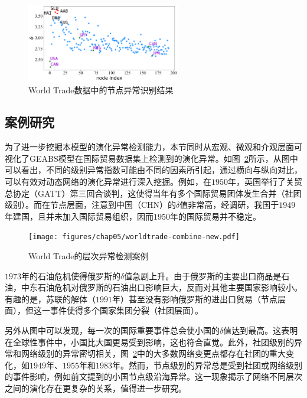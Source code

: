 \begin{figure}
	\centering
	\includegraphics[width=0.6\textwidth]{figures/chap05/worldtradenode-adjusted.pdf}
	\caption{World Trade数据中的节点异常识别结果}
	\label{fig:worldtradenode}
\end{figure}



\subsection{案例研究}

为了进一步挖掘本模型的演化异常检测能力，本节同时从宏观、微观和介观层面可视化了GEABS模型在国际贸易数据集上检测到的演化异常。如图~\ref{fig:worldtradecase}所示，从图中可以看出，不同的级别异常指数可能由不同的因素所引起，通过横向与纵向对比，可以有效对动态网络的演化异常进行深入挖掘。例如，在$1950$年，英国举行了关贸总协定（GATT）第三回合谈判，这使得当年有多个国际贸易团体发生合并（社团级别）。而在节点层面，注意到中国（CHN）的$\delta$值非常高，经调研，我国于$1949$年建国，且并未加入国际贸易组织，因而$1950$年的国际贸易并不稳定。

\begin{figure}
	\centering
	\texttt{[image: figures/chap05/worldtrade-combine-new.pdf]}
	\caption{World Trade的层次异常检测案例}
	\label{fig:worldtradecase}
\end{figure}

$1973$年的石油危机使得俄罗斯的$\delta$值急剧上升。由于俄罗斯的主要出口商品是石油，中东石油危机对俄罗斯的石油出口影响巨大，反而对其他主要国家影响较小。有趣的是，苏联的解体（$1991$年）甚至没有影响俄罗斯的进出口贸易（节点层面），但这一事件使得多个国家集团分裂（社团层面）。

另外从图中可以发现，每一次的国际重要事件总会使小国的$\delta$值达到最高。这表明在全球性事件中，小国比大国更易受到影响，这也符合直觉。此外，社团级别的异常和网络级别的异常密切相关，图~\ref{fig:worldtradecase}中的大多数网络变更点都存在社团的重大变化，如$1949$年、$1955$年和$1983$年。然而，节点级别的异常总是受到社团或网络级别的事件影响，例如前文提到的小国节点级沿海异常。这一现象揭示了网络不同层次之间的演化存在更复杂的关系，值得进一步研究。



